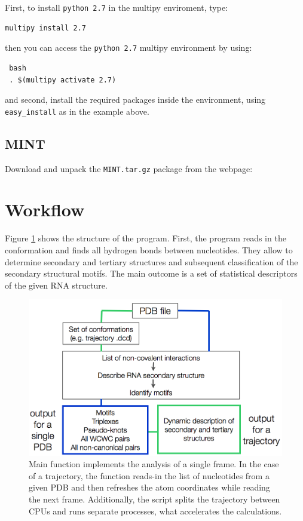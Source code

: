\documentclass[12pt]{article}
\begin{document}
First, to install {\tt python 2.7} in the multipy enviroment, type:
\begin{verbatim}
multipy install 2.7
\end{verbatim}
then you can access the {\tt python 2.7} multipy environment  by using:
\begin{verbatim}
 bash
 . $(multipy activate 2.7)
\end{verbatim}
and second, install the required packages inside the environment, using  {\tt easy\_install} as in the example above.

\subsection{MINT}
Download and unpack the \texttt{MINT.tar.gz} package from the webpage:
\\

\section{Workflow}
Figure \ref{ProgramScheme} shows the structure of the program. First, the program reads in the conformation and finds all hydrogen bonds between nucleotides. They allow to determine secondary and tertiary structures and subsequent classification of the secondary structural motifs. The main outcome is a set of statistical descriptors of the given RNA structure.  

\begin{figure}[h!]
\centering
\includegraphics[scale=0.4]{./pictures/workflow.png}
\caption{Main function implements the analysis of a single frame. In the case of a trajectory, the function reads-in the list of nucleotides from a given PDB and then refreshes the atom coordinates while reading the next frame. Additionally, the script splits the trajectory between CPUs and runs separate processes, what  accelerates the calculations.}
\label{ProgramScheme}
\end{figure}
\end{document}
